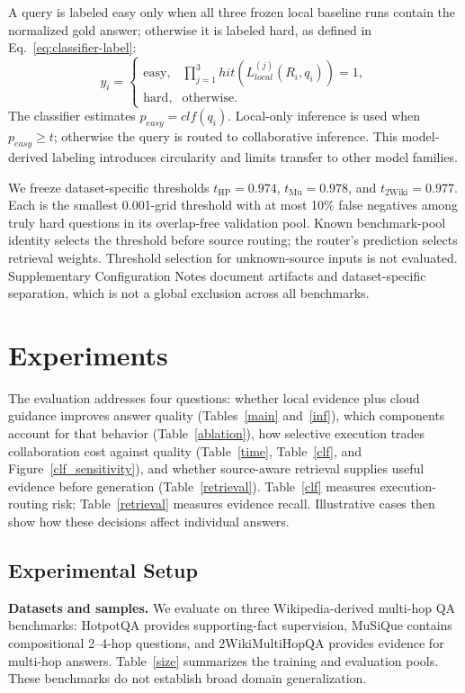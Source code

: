 \documentclass[a4paper,fleqn]{cas-dc}
\begin{document}
A query is labeled easy only when all three frozen local baseline runs contain the normalized gold answer; otherwise it is labeled hard, as defined in Eq.~\eqref{eq:classifier-label}:
\begin{equation}\label{eq:classifier-label}
y_i=\left\{\begin{array}{ll}
    \text{easy}, & \prod_{j=1}^{3} hit(L^{(j)}_{local}(R_i,q_i))=1, \\
    \text{hard}, & \text{otherwise}.
\end{array}\right.
\end{equation}
The classifier estimates \(p_{easy}=clf(q_i)\). Local-only inference is used when \(p_{easy}\ge t\); otherwise the query is routed to collaborative inference. This model-derived labeling introduces circularity and limits transfer to other model families.

We freeze dataset-specific thresholds \(t_{\mathrm{HP}}=0.974\), \(t_{\mathrm{Mu}}=0.978\), and \(t_{\mathrm{2Wiki}}=0.977\). Each is the smallest 0.001-grid threshold with at most 10\% false negatives among truly hard questions in its overlap-free validation pool. Known benchmark-pool identity selects the threshold before source routing; the router's prediction selects retrieval weights. Threshold selection for unknown-source inputs is not evaluated. Supplementary Configuration Notes document artifacts and dataset-specific separation, which is not a global exclusion across all benchmarks.


\section{Experiments}
The evaluation addresses four questions: whether local evidence plus cloud guidance improves answer quality (Tables~\ref{main} and~\ref{inf}), which components account for that behavior (Table~\ref{ablation}), how selective execution trades collaboration cost against quality (Table~\ref{time}, Table~\ref{clf}, and Figure~\ref{clf_sensitivity}), and whether source-aware retrieval supplies useful evidence before generation (Table~\ref{retrieval}). Table~\ref{clf} measures execution-routing risk; Table~\ref{retrieval} measures evidence recall. Illustrative cases then show how these decisions affect individual answers.
\subsection{Experimental Setup}
\textbf{Datasets and samples.} We evaluate on three Wikipedia-derived multi-hop QA benchmarks: HotpotQA \cite{yang2018hotpotqa} provides supporting-fact supervision, MuSiQue \cite{trivedi2022musique} contains compositional 2--4-hop questions, and 2WikiMultiHopQA \cite{ho2020constructing} provides evidence for multi-hop answers. Table~\ref{size} summarizes the training and evaluation pools. These benchmarks do not establish broad domain generalization.
\end{document}
